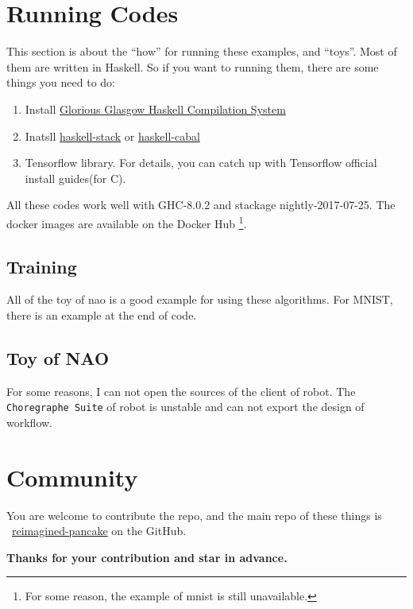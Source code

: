 \documentclass[twoside]{article}
\begin{document}
\begin{appendix}
	\section{Running Codes}
	\label{apdx:run}
	
	This section is about the ``how'' for running these examples, and ``toys''.
	Most of them are written in Haskell. So if you want to running them, there are some things
	you need to do:
	\begin{enumerate}
		\item Install \href{https://www.haskell.org/ghc}{Glorious Glasgow Haskell Compilation System}
		\item Inatsll \href{https://www.haskellstack.org}{haskell-stack} or \href{https://www.haskell.org/cabal/}{haskell-cabal}
		\item Tensorflow library. For details, you can catch up with Tensorflow official install guides(for C).
	\end{enumerate}

	All these codes work well with GHC-8.0.2 and stackage nightly-2017-07-25.
	The docker images are available on the Docker Hub%
	\footnote{For some reason, the example of mnist is still unavailable.}.
	
	\subsection{Training}
	\label{run:tc}
	
	All of the toy of nao is a good example for using these algorithms.
	For MNIST, there is an example at the end of code.
	
	\subsection{Toy of NAO}
	\label{run:toy}
	
	For some reasons, I can not open the sources of the client of robot. The \verb|Choregraphe Suite| of robot is unstable and can not export the design of workflow.
	
	
	
	\section{Community}
	\label{aptx:commuity}
	
	You are welcome to contribute the repo, and the main repo of these things is
	\ \href{https://github.com/Qinka/reimagined-pancake}{reimagined-pancake} on the GitHub.
	
	\vspace*{1em}
	\begin{center}
	{\large \textbf{Thanks for your contribution and star in advance.}}
	\end{center}
	
	
	\printbibliography
	\tableofcontents
\end{appendix}
\end{document}
